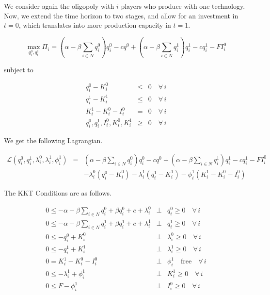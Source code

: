 \documentclass[11pt,a4paper]{article}
\begin{document}
We consider again the oligopoly with $i$ players who produce with one technology. Now, we extend the time horizon to two stages, and allow for an investment in $t=0$, which translates into more production capacity in $t=1$.

\begin{equation*}
	\max_{q_i^0,q_i^1}\Pi_i = (\alpha-\beta \sum_{i\in N}q_i^0)q_i^0 - cq^0 +  (\alpha-\beta \sum_{i\in N}q_i^1)q_i^1 - cq_i^1 -FI_i^0
\end{equation*}

subject to

\begin{eqnarray*}
	q_i^0 - K_i^0 &\leq& 0 \quad\forall\, i\\
	q_i^1 - K_i^1 &\leq& 0 \quad\forall\, i\\
        K_i^1 - K_i^0 - I_i^0 &=& 0 \quad\forall\, i\\
	q_i^0,q_i^1,I_i^0, K_i^0, K_i^1 &\geq& 0 \quad\forall\, i
\end{eqnarray*}
 
We get the following Lagrangian.

\begin{eqnarray*}
	\mathcal{L}(q_i^0,q_i^1,\lambda_i^0,\lambda_i^1,\phi_i^1)&=&  (\alpha-\beta \sum_{i\in N}q_i^0)q_i^0 - cq^0 +  (\alpha-\beta \sum_{i\in N}q_i^1)q_i^1 - cq_i^1 -FI_i^0\\
        && - \lambda_i^0(q_i^0-K_i^0) - \lambda_i^1(q_i^1-K_i^1) - \phi_i^1(K_i^1-K_i^0-I_i^0)
\end{eqnarray*}

The KKT Conditions are as follows.

\begin{eqnarray*}
	0 \leq -\alpha + \beta \sum_{i\in N}q_i^0 + \beta q_i^0+ c + \lambda_i^0 &\bot& q_i^0 \geq 0\quad\forall\, i\\
	0 \leq -\alpha + \beta \sum_{i\in N}q_i^1 + \beta q_i^1+ c + \lambda_i^1 &\bot& q_i^1 \geq 0\quad\forall\, i\\
	0 \leq -q_i^0 + K_i^0 &\bot& \lambda_i^0 \geq 0 \quad\forall\, i \\
        0 \leq -q_i^1 + K_i^1 &\bot& \lambda_i^1 \geq 0 \quad\forall\, i\\
        0 = K_i^1 - K_i^0 - I_i^0 &\bot& \phi_i^1 \quad \mbox{free} \quad\forall\, i \\
        0 \leq -\lambda_i^1 + \phi_i^1 &\bot& K_i^1 \geq 0 \quad\forall\, i\\
        0 \leq F - \phi_i^1 &\bot& I_i^0 \geq 0 \quad\forall\, i
\end{eqnarray*}
\end{document}
